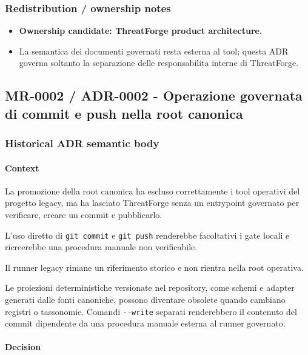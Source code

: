 \documentclass[
  10pt,
]{article}
\providecommand{\tightlist}{%
  \setlength{\itemsep}{0pt}\setlength{\parskip}{0pt}}
\begin{document}
\subsubsection{Redistribution / ownership
notes}\label{redistribution-ownership-notes-9}

\begin{itemize}
\tightlist
\item
  \textbf{Ownership candidate: ThreatForge product architecture.}
\item
  La semantica dei documenti governati resta esterna al tool; questa ADR
  governa soltanto la separazione delle responsabilita interne di
  ThreatForge.
\end{itemize}

\subsection{MR-0002 / ADR-0002 - Operazione governata di commit e push
nella root
canonica}\label{mr-0002-adr-0002---operazione-governata-di-commit-e-push-nella-root-canonica}

\subsubsection{Historical ADR semantic
body}\label{historical-adr-semantic-body-10}

\paragraph{Context}\label{context-20}

La promozione della root canonica ha escluso correttamente i tool
operativi del progetto legacy, ma ha lasciato ThreatForge senza un
entrypoint governato per verificare, creare un commit e pubblicarlo.

L'uso diretto di \texttt{git\ commit} e \texttt{git\ push} renderebbe
facoltativi i gate locali e ricreerebbe una procedura manuale non
verificabile.

Il runner legacy rimane un riferimento storico e non rientra nella root
operativa.

Le proiezioni deterministiche versionate nel repository, come schemi e
adapter generati dalle fonti canoniche, possono diventare obsolete
quando cambiano registri o tassonomie. Comandi \texttt{-\/-write}
separati renderebbero il contenuto del commit dipendente da una
procedura manuale esterna al runner governato.

\paragraph{Decision}\label{decision-20}
\end{document}

